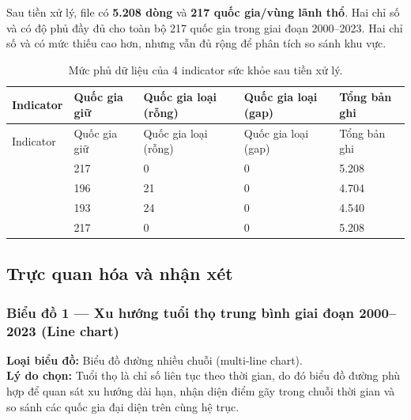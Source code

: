 Sau tiền xử lý, file  có \textbf{5.208 dòng} và \textbf{217 quốc gia/vùng lãnh thổ}. Hai chỉ số  và  có độ phủ đầy đủ cho toàn bộ 217 quốc gia trong giai đoạn 2000--2023. Hai chỉ số  và  có mức thiếu cao hơn, nhưng vẫn đủ rộng để phân tích so sánh khu vực.

\begin{longtable}{L{3.8cm}L{2.5cm}L{2.5cm}L{2.5cm}L{2.5cm}}
\caption{Mức phủ dữ liệu của 4 indicator sức khỏe sau tiền xử lý.}
\label{tab:health-coverage}\\
\toprule
Indicator & Quốc gia giữ & Quốc gia loại (rỗng) & Quốc gia loại (gap) & Tổng bản ghi \\
\midrule
\endfirsthead
\toprule
Indicator & Quốc gia giữ & Quốc gia loại (rỗng) & Quốc gia loại (gap) & Tổng bản ghi \\
\midrule
\endhead
{} & 217 & 0 & 0 & 5.208 \\
 & 196 & 21 & 0 & 4.704 \\
 & 193 & 24 & 0 & 4.540 \\
 & 217 & 0 & 0 & 5.208 \\
\bottomrule
\end{longtable}

\subsection{Trực quan hóa và nhận xét}

\subsubsection{Biểu đồ 1 --- Xu hướng tuổi thọ trung bình giai đoạn 2000--2023 (Line chart)}

\textbf{Loại biểu đồ:} Biểu đồ đường nhiều chuỗi (multi-line chart).\\
\textbf{Lý do chọn:} Tuổi thọ là chỉ số liên tục theo thời gian, do đó biểu đồ đường phù hợp để quan sát xu hướng dài hạn, nhận diện điểm gãy trong chuỗi thời gian và so sánh các quốc gia đại diện trên cùng hệ trục.


